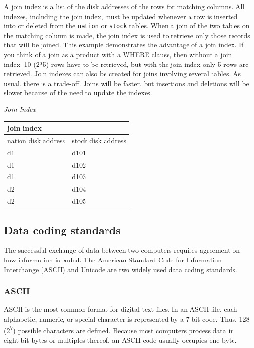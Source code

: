 \documentclass[
]{article}
\begin{document}
A join index is a list of the disk addresses of the rows for matching
columns. All indexes, including the join index, must be updated whenever
a row is inserted into or deleted from the \texttt{nation} or \texttt{stock} tables.
When a join of the two tables on the matching column is made, the join
index is used to retrieve only those records that will be joined. This
example demonstrates the advantage of a join index. If you think of a
join as a product with a WHERE clause, then without a join index, 10
(2*5) rows have to be retrieved, but with the join index only 5 rows
are retrieved. Join indexes can also be created for joins involving
several tables. As usual, there is a trade-off. Joins will be faster,
but insertions and deletions will be slower because of the need to
update the indexes.

\emph{Join Index}

\begin{longtable}[]{@{}ll@{}}
\toprule
join index & \\
\midrule
\endhead
nation disk address & stock disk address \\
d1 & d101 \\
d1 & d102 \\
d1 & d103 \\
d2 & d104 \\
d2 & d105 \\
\bottomrule
\end{longtable}

\hypertarget{data-coding-standards}{%
\subsection*{Data coding standards}\label{data-coding-standards}}

The successful exchange of data between two computers requires agreement
on how information is coded. The American Standard Code for Information
Interchange (ASCII) and Unicode are two widely used data coding
standards.

\hypertarget{ascii}{%
\subsubsection*{ASCII}\label{ascii}}

ASCII is the most common format for digital text files. In an ASCII
file, each alphabetic, numeric, or special character is represented by a
7-bit code. Thus, 128 (2\textsuperscript{7}) possible characters are defined. Because
most computers process data in eight-bit bytes or multiples thereof, an
ASCII code usually occupies one byte.
\end{document}
